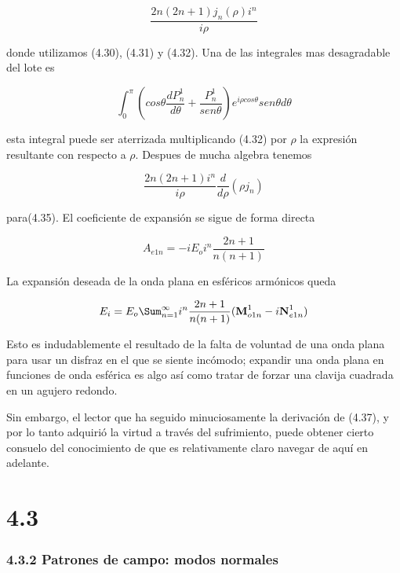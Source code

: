 \documentclass[graybox]{svmult}
\begin{document}
\begin{equation}
    \frac{2n(2n+1)j_{n}(\rho)i^{n}}{i\rho}
\end{equation}
 
donde utilizamos (4.30), (4.31) y (4.32). Una de las integrales mas desagradable del lote es

\begin{equation}
    \int_{0}^{\pi} (cos\theta\frac{dP^{1}_{n}}{d\theta}+\frac{P_{n}^{1}}{sen \theta}) e^{i\rho cos\theta} sen\theta d\theta
\end{equation}

esta integral puede ser aterrizada multiplicando (4.32) por $\rho$ la expresión resultante con respecto a $\rho$. Despues de mucha algebra tenemos

\begin{equation}
     \frac{2n(2n+1)i^{n}}{i\rho}\frac{d}{d\rho}(\rho j_{n}) 
\end{equation}

para(4.35). El coeficiente de expansión se sigue de forma directa

\begin{equation}
    A_{e1n}= -iE_{o}i^{n}\frac{2n+1}{n(n+1)}
\end{equation}

La expansión deseada de la onda plana en esféricos armónicos queda

\begin{equation}
    E_{i}=E_{o}\Sum_{n=1}^{\infty} i^{n} \frac{2n+1}{n(n+1)} (\textbf{M}_{o1n}^{1}-i\textbf{N}_{e1n}^{1})
\end{equation}
 
 
Esto es indudablemente el resultado de la falta de voluntad de una onda plana para usar un disfraz en el que se siente incómodo; expandir una onda plana en funciones de onda esférica es algo así como tratar de forzar una clavija cuadrada en un agujero redondo.


Sin embargo, el lector que ha seguido minuciosamente la derivación de (4.37), y por lo tanto adquirió la virtud a través del sufrimiento, puede obtener cierto consuelo del conocimiento de que es relativamente claro navegar de aquí en adelante.

\section*{4.3}

\subsubsection*{4.3.2 Patrones de campo: modos normales}
\end{document}
